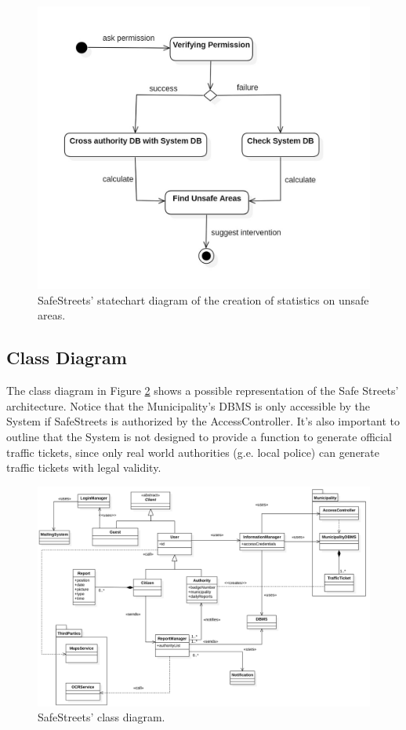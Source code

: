 \documentclass{report}
\begin{document}
\begin{figure}[!ht]
\begin{center}
\includegraphics[width=.8\textwidth]{./img/img_UnsafeAreas.jpg}
\end{center}
\caption{SafeStreets' statechart diagram of the creation of statistics on unsafe areas.}
\label{fig:State2}
\end{figure}
\newpage
\subsection{Class Diagram}
The class diagram in Figure \ref{fig:UML} shows a possible representation of the Safe Streets' architecture. Notice that the Municipality's DBMS is only accessible by the System if SafeStreets is authorized by the AccessController. It's also important to outline that the System is not designed to provide a function to generate official traffic tickets, since only real world authorities (g.e. local police) can generate traffic tickets with legal validity.
\begin{figure}[!ht]
\begin{center}
\includegraphics[width=\textwidth]{./img/SWE1.png}
\end{center}
\caption{SafeStreets' class diagram.}
\label{fig:UML}
\end{figure} 
\newpage
\end{document}
